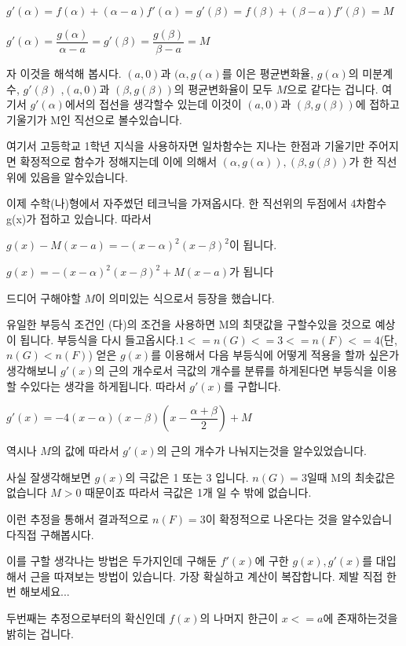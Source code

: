 \documentclass{oblivoir}
\begin{document}
$g'(\alpha) = f(\alpha) + (\alpha-a)f'(\alpha) =g'(\beta) = f(\beta) + (\beta-a)f'(\beta) = M $\par
$ g'(\alpha) = \dfrac{g(\alpha)}{\alpha-a}= g'(\beta)=\dfrac{g(\beta)}{\beta-a}=M $\par
자 이것을 해석해 봅시다. $(a,0)$과 $(\alpha,g(\alpha)$를 이은 평균변화율, $g(\alpha)$의 미분계수, $g'(\beta)$ ,$(a,0)$과 $(\beta,g(\beta))$의 평균변화율이 모두 $M$으로 같다는 겁니다. 여기서 $g'(\alpha)$에서의 접선을 생각할수 있는데 이것이 $(a,0)$과 $(\beta,g(\beta))$에 접하고 기울기가 M인 직선으로 볼수있습니다.\par\par
여기서 고등학교 1학년 지식을 사용하자면 일차함수는 지나는 한점과 기울기만 주어지면 확정적으로 함수가 정해지는데 이에 의해서 $( \alpha ,g( \alpha )) ,(\beta,g(\beta))$가 한 직선위에 있음을 알수있습니다. \par
이제 수학(나)형에서 자주썼던 테크닉을 가져옵시다.
한 직선위의 두점에서 4차함수 g(x)가 접하고 있습니다. 따라서\par $g(x)-M(x-a) = -(x-\alpha)^2(x-\beta)^2$이 됩니다. 
\par$g(x)= -(x-\alpha)^2(x-\beta)^2+M(x-a)$가 됩니다 \par
드디어 구해야할 $M$이 의미있는 식으로서 등장을 했습니다. \par
유일한 부등식 조건인 (다)의 조건을 사용하면 M의 최댓값을 구할수있을 것으로 예상이 됩니다. 부등식을 다시 들고옵시다.$1<= n(G) <= 3<= n(F) <= 4$(단, $n(G) < n(F)$) 얻은 $g(x)$를 이용해서 다음 부등식에 어떻게 적용을 할까 싶은가 생각해보니 $g'(x)$의 근의 개수로서 극값의 개수를 분류를 하게된다면 부등식을 이용할 수있다는 생각을 하게됩니다. 따라서
$g'(x)$를 구합니다. \par
$g'(x)=-4(x-\alpha)(x-\beta)(x-\dfrac{\alpha+\beta}{2})+M$\par
역시나 $M$의 값에 따라서 $g'(x)$의 근의 개수가 나눠지는것을 알수있었습니다.\par
사실 잘생각해보면 $g(x)$의 극값은 1 또는 3 입니다. $n(G)=3$일때 M의 최솟값은 없습니다 $M>0$ 때문이죠 따라서 극값은 1개 일 수 밖에 없습니다. \par
이런 추정을 통해서 결과적으로 $n(F)=3$이 확정적으로 나온다는 것을 알수있습니다 직접 구해봅시다.\par
이를 구할 생각나는 방법은 두가지인데 구해둔 $f'(x)$에 구한 $g(x),g'(x)$를 대입해서 근을 따져보는 방법이 있습니다. 가장 확실하고 계산이 복잡합니다. 제발 직접 한번 해보세요...\par\par
두번째는 추정으로부터의 확신인데 $f(x)$의 나머지 한근이 $x<=a$에 존재하는것을 밝히는 겁니다.\par
\end{document}
